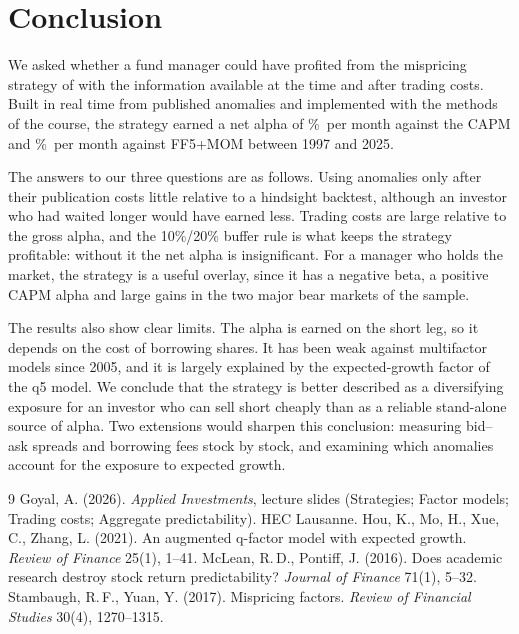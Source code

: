 \documentclass[12pt,a4paper]{article}
\newcommand{\pmo}{\%~per month}
\begin{document}
\section{Conclusion}\label{sec:concl}

We asked whether a fund manager could have profited from the mispricing strategy of \citet{stambaugh2017} with the information available at the time and after trading costs. Built in real time from published anomalies and implemented with the methods of the course, the strategy earned a net alpha of \netfullcapm\pmo{} against the CAPM and \netfulla\pmo{} against FF5+MOM between 1997 and 2025.

The answers to our three questions are as follows. Using anomalies only after their publication costs little relative to a hindsight backtest, although an investor who had waited longer would have earned less. Trading costs are large relative to the gross alpha, and the 10\%/20\% buffer rule is what keeps the strategy profitable: without it the net alpha is insignificant. For a manager who holds the market, the strategy is a useful overlay, since it has a negative beta, a positive CAPM alpha and large gains in the two major bear markets of the sample.

The results also show clear limits. The alpha is earned on the short leg, so it depends on the cost of borrowing shares. It has been weak against multifactor models since 2005, and it is largely explained by the expected-growth factor of the q5 model. We conclude that the strategy is better described as a diversifying exposure for an investor who can sell short cheaply than as a reliable stand-alone source of alpha. Two extensions would sharpen this conclusion: measuring bid--ask spreads and borrowing fees stock by stock, and examining which anomalies account for the exposure to expected growth.

\begin{singlespace}
\small
\begin{thebibliography}{9}
 Goyal, A. (2026). \emph{Applied Investments}, lecture slides (Strategies; Factor models; Trading costs; Aggregate predictability). HEC Lausanne.
 Hou, K., Mo, H., Xue, C., Zhang, L. (2021). An augmented q-factor model with expected growth. \emph{Review of Finance} 25(1), 1--41.
 McLean, R.\,D., Pontiff, J. (2016). Does academic research destroy stock return predictability? \emph{Journal of Finance} 71(1), 5--32.
 Stambaugh, R.\,F., Yuan, Y. (2017). Mispricing factors. \emph{Review of Financial Studies} 30(4), 1270--1315.
\end{thebibliography}
\end{singlespace}
\end{document}
